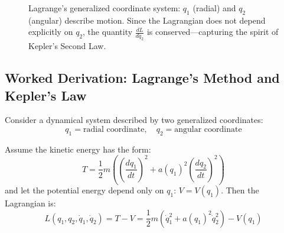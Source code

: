 \begin{figure}[H]
\centering
{}
\caption{Lagrange's generalized coordinate system: $q_1$ (radial) and $q_2$ (angular) describe motion. Since the Lagrangian does not depend explicitly on $q_2$, the quantity $\frac{dL}{d\dot{q}_2}$ is conserved—capturing the spirit of Kepler’s Second Law.}
\end{figure}





\subsection*{Worked Derivation: Lagrange’s Method and Kepler’s Law}

Consider a dynamical system described by two generalized coordinates:
\[
q_1 = \text{radial coordinate}, \quad q_2 = \text{angular coordinate}
\]

Assume the kinetic energy has the form:
\[
T = \frac{1}{2} m \left( \left( \frac{dq_1}{dt} \right)^2 + a(q_1)^2 \left( \frac{dq_2}{dt} \right)^2 \right)
\]
and let the potential energy depend only on \( q_1 \): \( V = V(q_1) \). Then the Lagrangian is:
\[
L(q_1, q_2, \dot{q}_1, \dot{q}_2) = T - V = \frac{1}{2} m \left( \dot{q}_1^2 + a(q_1)^2 \dot{q}_2^2 \right) - V(q_1)
\]

